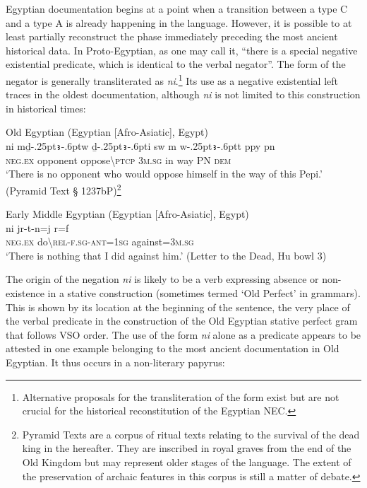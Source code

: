 \documentclass[output=paper]{langsci/langscibook}
\newcommand{\ꜥ}{ʿ}
\newcommand{\ꜣ}{\kern-.25pt\texttt{ꜣ}\kern-.6pt}
\begin{document}
Egyptian documentation begins at a point when a transition between a type C and a type A is already happening in the language. However, it is possible to at least partially reconstruct the phase immediately preceding the most ancient historical data. In Proto-Egyptian, as one may call it, ``there is a special negative existential predicate, which is identical to the verbal negator''.
The form of the negator is generally transliterated as \textit{ni}.\footnote{Alternative proposals for the transliteration of the form exist but are not crucial for the historical reconstitution of the Egyptian NEC.} 
Its use as a negative existential left traces in the oldest documentation, although \textit{ni} is not limited to this construction in historical times:

\ea Old Egyptian (Egyptian [Afro-Asiatic], Egypt) \label{ex:AE1}\\
  	\gll ni mḏ{\ꜣ}w ḏ{\ꜣ}i sw m w{\ꜣ}t ppy pn\\
	\textsc{neg.ex}	opponent oppose\textbackslash\textsc{ptcp} \textsc{3m.sg} in way 	PN \textsc{dem}\\
	\glt ‘There is no opponent who would oppose himself in the way of this Pepi.’ (Pyramid Text § 1237bP)\footnote{Pyramid Texts are a corpus of ritual texts relating to the survival of the dead king in the hereafter. They are inscribed in royal graves from the end of the Old Kingdom but may represent older stages of the language. The extent of the preservation of archaic features in this corpus is still a matter of debate.}
\z

\ea Early Middle Egyptian (Egyptian [Afro-Asiatic], Egypt) \label{ex:AE2}\\
	\gll ni jr-t-n=j r=f\\
	\textsc{neg.ex} do\textbackslash\textsc{rel-f.sg-ant=1sg} against=\textsc{3m.sg}\\
	\glt ‘There is nothing that I did against him.’ (Letter to the Dead, Hu bowl 3)
\z

The origin of the negation \textit{ni} is likely to be a verb expressing absence or non-existence in a stative construction (sometimes termed ‘Old Perfect’ in grammars). This is shown by its location at the beginning of the sentence, the very place of the verbal predicate in the construction of the Old Egyptian stative perfect gram that follows VSO order. The use of the form \textit{ni} alone as a predicate appears to be attested in one example belonging to the most ancient documentation in Old Egyptian. It thus occurs in a non-literary papyrus: 
\end{document}
